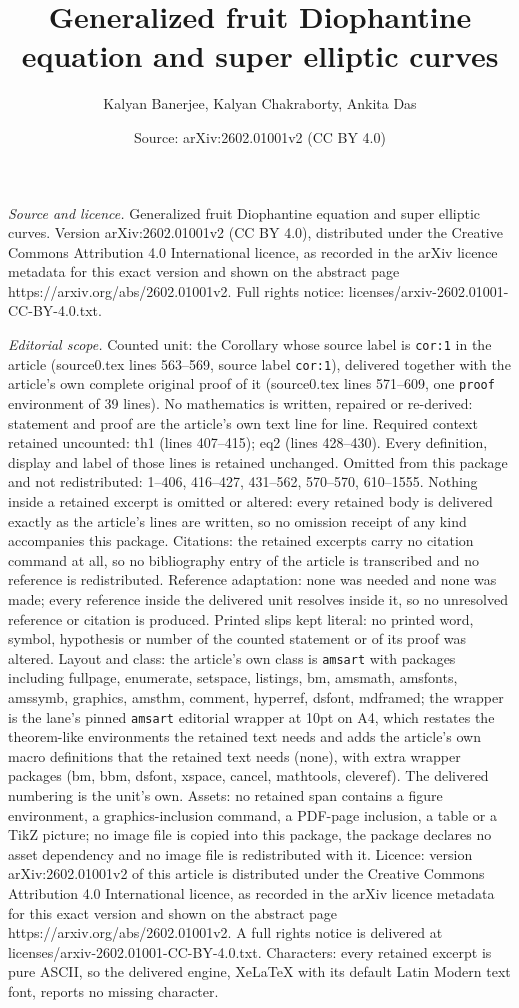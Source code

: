 \documentclass[10pt,a4paper]{amsart}
\title[Generalized fruit Diophantine equation and super elliptic cu]{Generalized fruit Diophantine equation and super elliptic curves}
\author{Kalyan Banerjee, Kalyan Chakraborty, Ankita Das}
\date{Source: arXiv:2602.01001v2 (CC BY 4.0)}
\begin{document}
\maketitle

\noindent\emph{Source and licence.} Generalized fruit Diophantine equation and super elliptic curves. Version arXiv:2602.01001v2 (CC BY 4.0), distributed under the Creative Commons Attribution 4.0 International licence, as recorded in the arXiv licence metadata for this exact version and shown on the abstract page https://arxiv.org/abs/2602.01001v2. Full rights notice: licenses/arxiv-2602.01001-CC-BY-4.0.txt.\par\smallskip

\noindent\textit{Editorial scope.} Counted unit: the Corollary whose source label is \texttt{cor:1} in the article (source0.tex lines 563--569, source label \texttt{cor:1}), delivered together with the article's own complete original proof of it (source0.tex lines 571--609, one \texttt{proof} environment of 39 lines). No mathematics is written, repaired or re-derived: statement and proof are the article's own text line for line. Required context retained uncounted: th1 (lines 407--415); eq2 (lines 428--430). Every definition, display and label of those lines is retained unchanged. Omitted from this package and not redistributed: 1--406, 416--427, 431--562, 570--570, 610--1555. Nothing inside a retained excerpt is omitted or altered: every retained body is delivered exactly as the article's lines are written, so no omission receipt of any kind accompanies this package. Citations: the retained excerpts carry no citation command at all, so no bibliography entry of the article is transcribed and no reference is redistributed. Reference adaptation: none was needed and none was made; every reference inside the delivered unit resolves inside it, so no unresolved reference or citation is produced. Printed slips kept literal: no printed word, symbol, hypothesis or number of the counted statement or of its proof was altered. Layout and class: the article's own class is \texttt{amsart} with packages including fullpage, enumerate, setspace, listings, bm, amsmath, amsfonts, amssymb, graphics, amsthm, comment, hyperref, dsfont, mdframed; the wrapper is the lane's pinned \texttt{amsart} editorial wrapper at 10pt on A4, which restates the theorem-like environments the retained text needs and adds the article's own macro definitions that the retained text needs (none), with extra wrapper packages (bm, bbm, dsfont, xspace, cancel, mathtools, cleveref). The delivered numbering is the unit's own. Assets: no retained span contains a figure environment, a graphics-inclusion command, a PDF-page inclusion, a table or a TikZ picture; no image file is copied into this package, the package declares no asset dependency and no image file is redistributed with it. Licence: version arXiv:2602.01001v2 of this article is distributed under the Creative Commons Attribution 4.0 International licence, as recorded in the arXiv licence metadata for this exact version and shown on the abstract page https://arxiv.org/abs/2602.01001v2. A full rights notice is delivered at licenses/arxiv-2602.01001-CC-BY-4.0.txt. Characters: every retained excerpt is pure ASCII, so the delivered engine, XeLaTeX with its default Latin Modern text font, reports no missing character.
\end{document}
